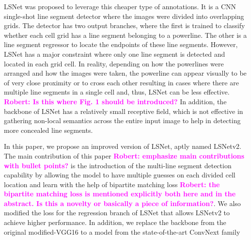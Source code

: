 \documentclass[journal]{IEEEtran}
\newcommand{\commentR}[1]{\textbf{\textcolor{magenta}{Robert: #1}}}
\begin{document}
LSNet \cite{Nguyen2020} was proposed to leverage this cheaper type of annotations. It is a CNN single-shot line segment detector where the images were divided into overlapping grids. The detector has two output branches, where the first is trained to classify whether each cell grid has a line segment belonging to a powerline. The other is a line segment regressor to locate the endpoints of these line segments. However, LSNet has a major constraint where only one line segment is detected and located in each grid cell. In reality, depending on how the powerlines were arranged and how the images were taken, the powerline can appear visually to be of very close proximity or to cross each other resulting in cases where there are multiple line segments in a single cell and, thus, LSNet can be less effective. \commentR{Is this where Fig. 1 should be introduced?} In addition, the backbone of LSNet has a relatively small receptive field, which is not effective in gathering non-local semantics across the entire input image to help in detecting more concealed line segments.

In this paper, we propose an improved version of LSNet, aptly named LSNetv2. The main contribution of this paper \commentR{emphasize main contributions with bullet points?} is the introduction of the multi-line segment detection capability by allowing the model to have multiple guesses on each divided cell location and learn with the help of bipartite matching loss \commentR{the bipartite matching loss is mentioned explicitly both here and in the abstract. Is this a novelty or basically a piece of information?}. We also modified the loss for the regression branch of LSNet that allows LSNetv2 to achieve higher performance. In addition, we replace the backbone from the original modified-VGG16 \cite{vgg} to a model from the state-of-the-art ConvNext family \cite{convnext}


%
%
\end{document}

